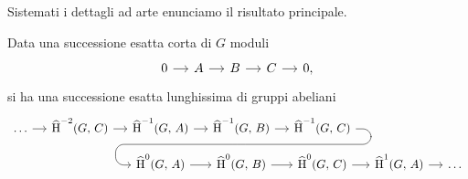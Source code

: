 Sistemati i dettagli ad arte enunciamo il risultato principale.

\begin{theorem}\label{fond2}
	Data una successione esatta corta di $ G $ moduli
	\[\begin{tikzcd}[column sep = small]
	0 \rar & A \rar & B \rar & C \rar & 0,
	\end{tikzcd}\]
	si ha una successione esatta lunghissima di gruppi abeliani
	\[\begin{tikzcd}[column sep = small, row sep = small]
	\dots \rar & \Hh^{-2}(G, \, C) \rar &\Hh^{-1}(G, \, A) \rar & \Hh^{-1}(G, \, B) \arrow[d,phantom, ""{coordinate, name=W}] \rar & \Hh^{-1}(G, \, C) \arrow[dll, 
	rounded corners = 7 pt, 
	to path={ --([xshift=3ex]\tikztostart.east)
		|- (W)[near end]\tikztonodes
		-| ([xshift=-3ex]\tikztotarget.west)
		-- (\tikztotarget)}] && \\
	&&\Hh^0(G, \, A) \rar & \Hh^0(G, \, B) \rar & \Hh^0(G, \, C) \rar
	 & \Hh^1(G, \, A) \rar & \dots \end{tikzcd}\]
\end{theorem}
